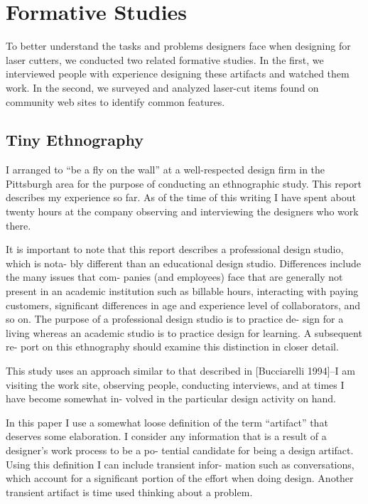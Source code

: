 \chapter{Formative Studies}
\label{sec:formative}


To better understand the tasks and problems designers face when
designing for laser cutters, we conducted two related formative
studies.  In the first, we interviewed people with experience
designing these artifacts and watched them work. In the second, we
surveyed and analyzed laser-cut items found on community web sites to
identify common features.

\section{Tiny Ethnography}
\label{sec:formative-tiny-ethnography}

I arranged to “be a fly on the wall” at a well-respected design firm
in the Pittsburgh area for the purpose of conducting an ethnographic
study. This report describes my experience so far. As of the time of
this writing I have spent about twenty hours at the company observing
and interviewing the designers who work there.

It is important to note that this report describes a professional
design studio, which is nota- bly different than an educational design
studio. Differences include the many issues that com- panies (and
employees) face that are generally not present in an academic
institution such as billable hours, interacting with paying customers,
significant differences in age and experience level of collaborators,
and so on. The purpose of a professional design studio is to practice
de- sign for a living whereas an academic studio is to practice design
for learning. A subsequent re- port on this ethnography should examine
this distinction in closer detail.

This study uses an approach similar to that described in [Bucciarelli
  1994]--I am visiting the work site, observing people, conducting
interviews, and at times I have become somewhat in- volved in the
particular design activity on hand.

In this paper I use a somewhat loose definition of the term “artifact”
that deserves some elaboration. I consider any information that is a
result of a designer’s work process to be a po- tential candidate for
being a design artifact. Using this definition I can include transient
infor- mation such as conversations, which account for a significant
portion of the effort when doing design. Another transient artifact is
time used thinking about a problem.


